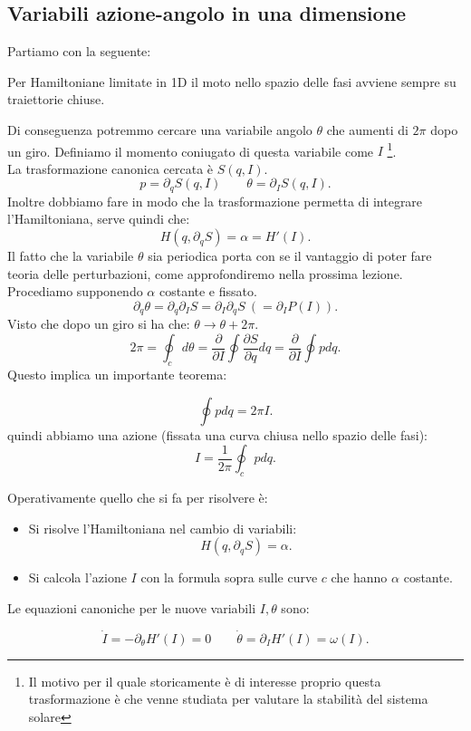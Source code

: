 \subsection{Variabili azione-angolo in una dimensione}%
\label{sub:Variabili azione-angolo}
Partiamo con la seguente:
\begin{redbox}{}
    Per Hamiltoniane limitate in 1D il moto nello spazio delle fasi avviene sempre su traiettorie chiuse.
\end{redbox}
\noindent
Di conseguenza potremmo cercare una variabile angolo $\theta$ che aumenti di $2\pi$ dopo un giro. Definiamo il momento coniugato di questa variabile come $I$
\footnote{Il motivo per il quale storicamente è di interesse proprio questa trasformazione è che venne studiata per valutare la stabilità del sistema solare}.\\
La trasformazione canonica cercata è $S(q, I)$.
\[
    p = \partial_{q}S(q,I) \qquad \theta  = \partial_{I}S(q,I) 
.\] 
Inoltre dobbiamo fare in modo che la trasformazione permetta di integrare l'Hamiltoniana, serve quindi che:
\[
    H(q, \partial_{q}S) = \alpha  = H'(I) 
.\] 
Il fatto che la variabile $\theta$ sia periodica porta con se il vantaggio di poter fare teoria delle perturbazioni, come approfondiremo nella prossima lezione.\\
Procediamo supponendo $\alpha$ costante e fissato. 
\[
    \partial_{q}\theta  = \partial_{q}\partial_{I}S = \partial_{I}\partial_{q}S \ ( = \partial_{I}P(I) ) 
.\] 
Visto che dopo un giro si ha che: $\theta\to \theta +2\pi$.
\[
    2\pi  = \oint _c d\theta  = \frac{\partial }{\partial I} \oint \frac{\partial S}{\partial q} dq = \frac{\partial }{\partial I} \oint p dq 
.\] 
Questo implica un importante teorema:
\begin{redbox}{}
    \[
        \oint pdq = 2\pi I 
    .\] 
    quindi abbiamo una azione (fissata una curva chiusa nello spazio delle fasi):
    \[
        I = \frac{1}{2\pi}\oint_c pdq 
    .\] 
\end{redbox}
\noindent
Operativamente quello che si fa per risolvere è:
\begin{itemize}
    \item Si risolve l'Hamiltoniana nel cambio di variabili:
	\[
	    H(q,\partial_{q}S) = \alpha
	.\] 
    \item Si calcola l'azione $I$ con la formula sopra sulle curve $c$ che hanno $\alpha$ costante.
\end{itemize}
Le equazioni canoniche per le nuove variabili $I,\theta$ sono:
\begin{redbox}{}
\[
    \dot{I}=-\partial_{\theta  }H'(I) = 0 \qquad \dot{\theta} = \partial_{I}H'(I) = \omega (I) 
.\]    
\end{redbox}
